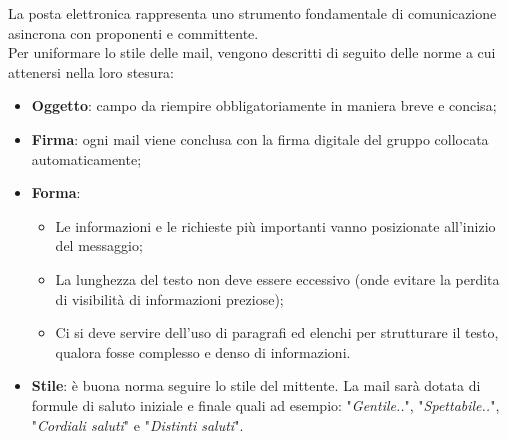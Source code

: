 \documentclass[10pt, a4paper]{article}
\begin{document}
     La posta elettronica rappresenta uno strumento fondamentale di comunicazione asincrona con proponenti e committente.\\ 
    Per uniformare lo stile delle mail, vengono descritti di seguito delle norme a cui attenersi nella loro stesura:
    \begin{itemize}
        \item \textbf{Oggetto}: campo da riempire obbligatoriamente in maniera breve e concisa;
        \item \textbf{Firma}: ogni mail viene conclusa con la firma digitale del gruppo collocata automaticamente;
        \item \textbf{Forma}:
        \begin{itemize}
            \item Le informazioni e le richieste più importanti vanno posizionate all'inizio del messaggio;
            \item La lunghezza del testo non deve essere eccessivo (onde evitare la perdita di visibilità di informazioni preziose);
            \item Ci si deve servire dell'uso di paragrafi ed elenchi per strutturare il testo, qualora fosse complesso e denso di informazioni.
        \end{itemize} 
        \item \textbf{Stile}: è buona norma seguire lo stile del mittente. La mail sarà dotata di formule di saluto iniziale e finale quali 
        ad esempio: "\textit{Gentile..}", "\textit{Spettabile..}", "\textit{Cordiali saluti}" e "\textit{Distinti saluti}".
    \end{itemize}
    
\end{document}

